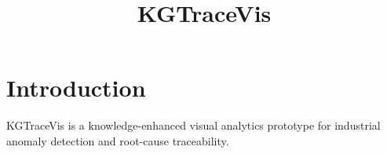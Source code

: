 \documentclass{article}
\title{KGTraceVis}
\author{}
\date{}
\begin{document}
\maketitle

\section{Introduction}

KGTraceVis is a knowledge-enhanced visual analytics prototype for industrial
anomaly detection and root-cause traceability.
\end{document}
